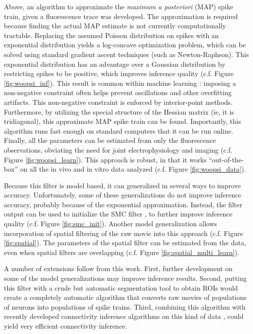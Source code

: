 
Above, an algorithm to approximate the \emph{maximum a posteriori} (MAP) spike train, given a fluorescence trace was developed.  The approximation is required because finding the actual MAP estimate is not currently computationally tractable.  Replacing the assumed Poisson distribution on spikes with an exponential distribution yields a log-concave optimization problem, which can be solved using standard gradient ascent techniques (such as Newton-Raphson).  This exponential distribution has an advantage over a Gaussian distribution by restricting spikes to be positive, which improves inference quality (c.f. Figure \ref{fig:woopsi_inf}).  This result is common within machine learning \cite{Hoyer04,OGradyPearlmutter06}: imposing a non-negative constraint often helps prevent oscillations and other overfitting artifacts. This non-negative constraint is enforced by interior-point methods.  Furthermore, by utilizing the special structure of the Hessian matrix (ie, it is tridiagonal), this approximate MAP spike train can be found.  Importantly, this algorithm runs fast enough on standard computers that it can be run online.  Finally, all the parameters can be estimated from only the fluorescence observations, obviating the need for joint electrophysiology and imaging (c.f. Figure \ref{fig:woopsi_learn}).  This approach is robust, in that it works ``out-of-the-box'' on all the in vivo and in vitro data analyzed (c.f. Figure \ref{fig:woopsi_data}).

Because this filter is model based, it can generalized in several ways to improve accuracy.  Unfortunately, some of these generalizations do not improve inference accuracy, probably because of the exponential approximation.  Instead, the \foopsi filter output can be used to initialize the SMC filter \cite{VogelsteinPaninski09}, to further improve inference quality (c.f. Figure \ref{fig:smc_init}).  Another model generalization allows incorporation of spatial filtering of the raw movie into this approach (c.f. Figure \ref{fig:spatial}).  The parameters of the spatial filter can be estimated from the data, even when spatial filters are overlapping (c.f. Figure \ref{fig:spatial_multi_learn}).

A number of extensions follow from this work.  First, further development on some of the model generalizations may improve inference results. Second, putting this filter with a crude but automatic segmentation tool to obtain ROIs would create a completely automatic algorithm that converts raw movies of populations of neurons into populations of spike trains.  Third, combining this algorithm with recently developed connectivity inference algorithms on this kind of data \cite{MishchenkoPaninski09}, could yield very efficient connectivity inference.